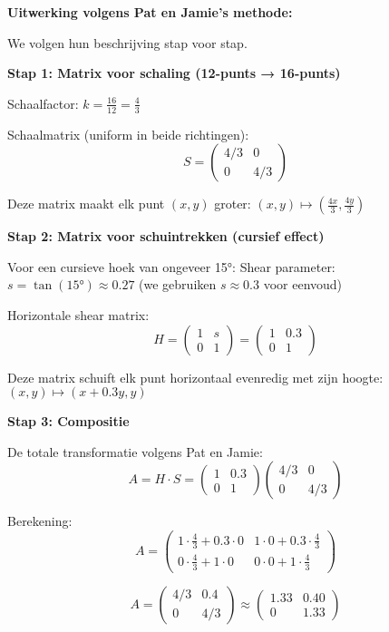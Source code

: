 \documentclass{ximera}
\begin{document}
\begin{freeResponse}
\textbf{Uitwerking volgens Pat en Jamie's methode:}

We volgen hun beschrijving stap voor stap.

\textbf{Stap 1: Matrix voor schaling (12-punts → 16-punts)}

Schaalfactor: $k = \frac{16}{12} = \frac{4}{3}$

Schaalmatrix (uniform in beide richtingen):
$$S = \begin{pmatrix} 4/3 & 0 \\ 0 & 4/3 \end{pmatrix}$$

Deze matrix maakt elk punt $(x, y)$ groter: $(x, y) \mapsto (\frac{4x}{3}, \frac{4y}{3})$

\textbf{Stap 2: Matrix voor schuintrekken (cursief effect)}

Voor een cursieve hoek van ongeveer 15°:
Shear parameter: $s = \tan(15°) \approx 0.27$ (we gebruiken $s \approx 0.3$ voor eenvoud)

Horizontale shear matrix:
$$H = \begin{pmatrix} 1 & s \\ 0 & 1 \end{pmatrix} = \begin{pmatrix} 1 & 0.3 \\ 0 & 1 \end{pmatrix}$$

Deze matrix schuift elk punt horizontaal evenredig met zijn hoogte: $(x, y) \mapsto (x + 0.3y, y)$

\textbf{Stap 3: Compositie}

De totale transformatie volgens Pat en Jamie:
$$A = H \cdot S = \begin{pmatrix} 1 & 0.3 \\ 0 & 1 \end{pmatrix} \begin{pmatrix} 4/3 & 0 \\ 0 & 4/3 \end{pmatrix}$$

Berekening:
$$A = \begin{pmatrix} 1 \cdot \frac{4}{3} + 0.3 \cdot 0 & 1 \cdot 0 + 0.3 \cdot \frac{4}{3} \\ 0 \cdot \frac{4}{3} + 1 \cdot 0 & 0 \cdot 0 + 1 \cdot \frac{4}{3} \end{pmatrix}$$

$$A = \begin{pmatrix} 4/3 & 0.4 \\ 0 & 4/3 \end{pmatrix} \approx \begin{pmatrix} 1.33 & 0.40 \\ 0 & 1.33 \end{pmatrix}$$


\end{freeResponse}
\end{document}
